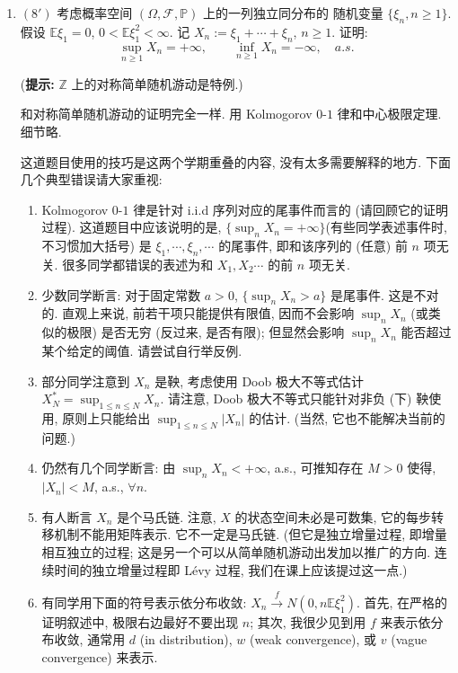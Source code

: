 \begin{enumerate}
    \item[三、]$(8')$ 考虑概率空间 $(\Omega,\mathscr F,\mathbb P)$ 上的一列独立同分布的
    随机变量 $\{\xi_n,n\geq 1\}$. 假设 $\mathbb E\xi_1=0$, $0<\mathbb E\xi_1^2<\infty$.
    记 $X_n:=\xi_1+\cdots+\xi_n$, $n\geq 1$. 证明:
    \[
        \sup_{n\geq 1}X_n=+\infty,\qquad \inf_{n\geq 1}X_n=-\infty,\quad a.s.
    \]

    (\textbf{提示:} $\mathbb Z$ 上的对称简单随机游动是特例.)

    \begin{proofc}[证明]
        和对称简单随机游动的证明完全一样. 用 Kolmogorov $0$-$1$ 律和中心极限定理.
        细节略.

        这道题目使用的技巧是这两个学期重叠的内容, 没有太多需要解释的地方. 下面几个典型错误请大家重视:
        \begin{enumerate}[label=(\arabic*)] 
            \item Kolmogorov $0$-$1$ 律是针对 i.i.d 序列对应的尾事件而言的 (请回顾它的证明过程). 这道题目中应该说明的是, $\{\sup_n X_n=+\infty\}$(有些同学表述事件时, 不习惯加大括号) 是 $\xi_1,\cdots,\xi_n,\cdots$ 的尾事件, 即和该序列的 (任意) 前 $n$ 项无关. 很多同学都错误的表述为和 $X_1,X_2\cdots$ 的前 $n$ 项无关. 
            \item 少数同学断言: 对于固定常数 $a>0$, $\{\sup_n X_n>a\}$ 是尾事件. 这是不对的. 直观上来说, 前若干项只能提供有限值, 因而不会影响 $\sup_n X_n$ (或类似的极限) 是否无穷 (反过来, 是否有限); 但显然会影响 $\sup_n X_n$ 能否超过某个给定的阈值. 请尝试自行举反例. 
            \item 部分同学注意到 $X_n$ 是鞅, 考虑使用 Doob 极大不等式估计 $X_N^*=\sup_{1\leq n\leq N}X_n$. 请注意, Doob 极大不等式只能针对非负 (下) 鞅使用, 原则上只能给出 $\sup_{1\leq n\leq N}|X_n|$ 的估计. (当然, 它也不能解决当前的问题.) 
            \item 仍然有几个同学断言: 由 $\sup_n X_n<+\infty$, a.s., 可推知存在 $M>0$ 使得, $|X_n|<M$, a.s., $\forall n$. 
            \item 有人断言 $X_n$ 是个马氏链. 注意, $X$ 的状态空间未必是可数集, 它的每步转移机制不能用矩阵表示. 它不一定是马氏链. (但它是独立增量过程, 即增量相互独立的过程; 这是另一个可以从简单随机游动出发加以推广的方向. 连续时间的独立增量过程即 Lévy 过程, 我们在课上应该提过这一点.) 
            \item 有同学用下面的符号表示依分布收敛: $X_n\overset{f}{\to}N(0,n\mathbb E\xi_1^2)$. 首先, 在严格的证明叙述中, 极限右边最好不要出现 $n$; 其次, 我很少见到用 $f$ 来表示依分布收敛, 通常用 $d$ (in distribution), $w$ (weak convergence), 或 $v$ (vague convergence) 来表示. 
        \end{enumerate}
    \end{proofc}


\end{enumerate}
